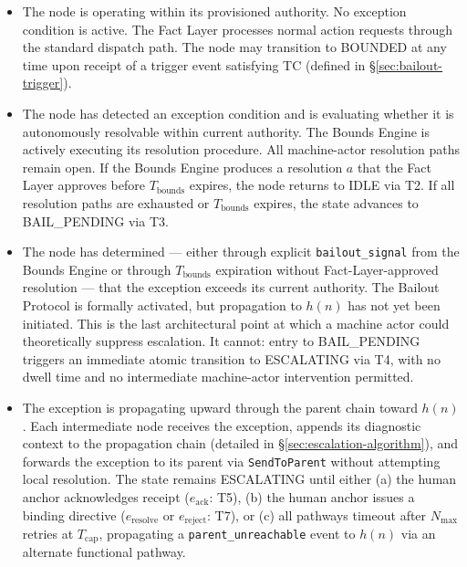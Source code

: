 \begin{itemize}\itemsep0em
\item[\textbf{IDLE.}] The node is operating within its provisioned authority. No exception condition is active. The Fact Layer processes normal action requests through the standard dispatch path. The node may transition to BOUNDED at any time upon receipt of a trigger event satisfying TC (defined in \S\ref{sec:bailout-trigger}).

\item[\textbf{BOUNDED.}] The node has detected an exception condition and is evaluating whether it is autonomously resolvable within current authority. The Bounds Engine is actively executing its resolution procedure. All machine-actor resolution paths remain open. If the Bounds Engine produces a resolution $a$ that the Fact Layer approves before $T_{\text{bounds}}$ expires, the node returns to IDLE via T2. If all resolution paths are exhausted or $T_{\text{bounds}}$ expires, the state advances to BAIL\_PENDING via T3.

\item[\textbf{BAIL\_PENDING.}] The node has determined — either through explicit \texttt{bailout\_signal} from the Bounds Engine or through $T_{\text{bounds}}$ expiration without Fact-Layer-approved resolution — that the exception exceeds its current authority. The Bailout Protocol is formally activated, but propagation to $h(n)$ has not yet been initiated. This is the last architectural point at which a machine actor could theoretically suppress escalation. It cannot: entry to BAIL\_PENDING triggers an immediate atomic transition to ESCALATING via T4, with no dwell time and no intermediate machine-actor intervention permitted.

\item[\textbf{ESCALATING.}] The exception is propagating upward through the parent chain toward $h(n)$. Each intermediate node receives the exception, appends its diagnostic context to the propagation chain (detailed in \S\ref{sec:escalation-algorithm}), and forwards the exception to its parent via \texttt{SendToParent} without attempting local resolution. The state remains ESCALATING until either (a) the human anchor acknowledges receipt ($e_{\text{ack}}$: T5), (b) the human anchor issues a binding directive ($e_{\text{resolve}}$ or $e_{\text{reject}}$: T7), or (c) all pathways timeout after $N_{\max}$ retries at $T_{\text{cap}}$, propagating a \texttt{parent\_unreachable} event to $h(n)$ via an alternate functional pathway.


\end{itemize}
